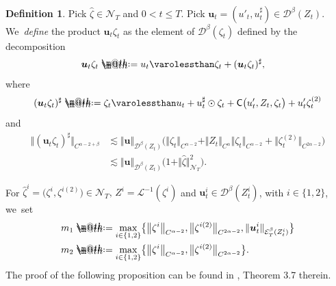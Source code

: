 \documentclass[JEP,XML,SOM,Unicode,published]{cedram}
\makeatletter
\theoremstyle{definition}
\newtheorem{defn}[thm]{Definition}
\newcommand{\mcD}{\mathcal{D}}
\newcommand{\mcE}{\mathcal{E}}
\newcommand{\mcN}{\mathcal{N}}
\newcommand{\bsu}{\boldsymbol{u}}
\newcommand*{\defeq}{\mathrel{\rlap{%
\raisebox{0.3ex}{$\m@th\cdot$}}%
\raisebox{-0.3ex}{$\m@th\cdot$}}%
=}
\newcommand{\norme}[1]{\Vert #1 \Vert}
\newcommand{\scrL}{\mathscr{L}}
\makeatother
\begin{document}
\begin{defn} \label{produit}
Pick $\widehat\zeta\in{{\boldsymbol{\mcN}}_T}$ and $0<t\leq T$. Pick $\bsu_t = (u'_t,u^\sharp_t) \in \mcD^\beta(Z_t)$. We~\emph{define} the product $\bsu_t\zeta_t$ as the element of $\mcD^\beta(\zeta_t)$ defined by the decomposition
\begin{equation*} \begin{split}
\bsu_t\zeta_t &\defeq u_t \varolessthan \zeta_t + (\bsu_t\zeta_t)^\sharp,
\end{split} \end{equation*}
where
\[
(\bsu_t\zeta_t)^\sharp \defeq \zeta_t \varolessthan u_t + u_t^\sharp\odot \zeta_t + \mathsf{C}\bigl(u_t', Z_t, \zeta_t\bigr) + u_t'\zeta^{(2)}_t
\]
and
\begin{equation} \label{EqEstimateProductSharp} \begin{split}
\norme{(\bsu_t\zeta_t)^\sharp}_{C^{\alpha-2+\beta}} &\lesssim \norme\bsu_{\mathcal{D}^\beta(Z_t)}\bigl( \norme{\zeta_t}_{C^{\alpha-2}} + \norme{Z_t}_{C^\alpha} \norme{\zeta_t}_{C^{\alpha-2}} + \big\Vert\zeta^{(2)}_t\big\Vert_{C^{2\alpha-2}}\bigr) \\
& \lesssim \norme\bsu_{\mathcal{D}^\beta(Z_t)} \bigl(1+\Vert \widehat{\zeta}\Vert_{{\boldsymbol{\mcN}}_T}^2\bigr).
\end{split} \end{equation}
\end{defn}

For $\widehat\zeta^i = \bigl(\zeta^i,\zeta^{i(2)}\bigr)\in{{\boldsymbol{\mcN}}_T}, \,Z^i = \scrL^{-1}(\zeta^i)$ and $\bsu^i_t\in\mcD^\beta(Z^i_t)$, with $i\in\{1,2\}$, we~set
\begin{equation*} \begin{split}
m_1 &\defeq \underset{i\in\{1,2\}}{\max}\bigl\{ {\big\Vert} {\zeta^i}\big\Vert_{C^{\alpha-2}}, {\big\Vert} {\zeta^{i(2)}}\big\Vert_{C^{2\alpha-2}}, \norme{\bsu^i_t}_{\mcE^\beta_T(Z^i_t)} \bigr\} \\
m_2 & \defeq \underset{i\in\{1,2\}}{\max}\bigl\{ {\big\Vert} {\zeta^i}\big\Vert_{C^{\alpha-2}}, {\big\Vert} {\zeta^{i(2)}}\big\Vert_{C^{2\alpha-2}}\bigr\}.
\end{split} \end{equation*}
The proof of the following proposition can be found in \cite{GIP}, Theorem 3.7 therein.
\end{document}
